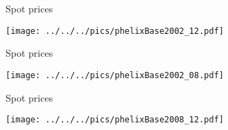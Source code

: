 {Spot prices}
\begin{center}
\texttt{[image: ../../../pics/phelixBase2002\_12.pdf]}
\end{center}

{Spot prices}
\begin{center}
\texttt{[image: ../../../pics/phelixBase2002\_08.pdf]}
\end{center}

{Spot prices}
\begin{center}
\texttt{[image: ../../../pics/phelixBase2008\_12.pdf]}
\end{center}

